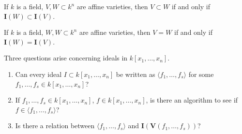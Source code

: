\documentclass[crop=false,class=book,oneside]{standalone}
\begin{document}
                \begin{theorem}
                    If $k$ is a field, $V,W\subset k^n$ are affine
                    varieties, then $V\subset W$ if and only if
                    $\mathbf{I}(W)\subset \mathbf{I}(V)$.
                \end{theorem}
                \begin{theorem}
                    If $k$ is a field, $W,W\subset k^n$ are
                    affine varieties, then $V=W$ if
                    and only if $\mathbf{I}(W)=\mathbf{I}(V)$.
                \end{theorem}
                Three questions arise concerning
                ideals in $k[x_1,\hdots ,x_n]$.
                \begin{enumerate}
                    \item Can every ideal $I\subset k[x_1,\hdots ,x_n]$
                          be written as $\langle f_1,\hdots, f_s\rangle$
                          for some $f_1,\hdots, f_s \in k[x_1,\hdots ,x_n]$?
                    \item If $f_1,\hdots, f_s\in k[x_1,\hdots ,x_n]$,
                          $f\in k[x_1,\hdots ,x_n]$, is there an
                          algorithm to see if $f\in\langle f_{1},\hdots,f_{s}\rangle$?
                    \item Is there a relation between
                          $\langle f_1,\hdots, f_s\rangle$ and
                          $\mathbf{I}(\mathbf{V}(f_1,\hdots, f_s))$?
                \end{enumerate}
\end{document}

